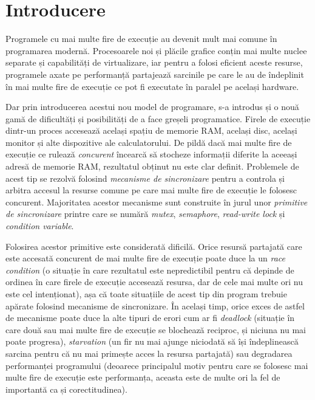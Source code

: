 \section{Introducere}
Programele cu mai multe fire de execuție au devenit mult mai comune
în programarea modernă. Procesoarele noi și plăcile grafice conțin mai
multe nuclee separate și capabilități de virtualizare, iar pentru a
folosi eficient aceste resurse, programele axate pe performanță
partajează sarcinile pe care le au de îndeplinit în mai multe fire de
execuție ce pot fi executate în paralel pe același hardware.

Dar prin introducerea acestui nou model de programare, s-a introdus și o
nouă gamă de dificultăți și posibilități de a face greșeli programatice.
Firele de execuție dintr-un proces accesează același spațiu de memorie
RAM, același disc, același monitor și alte dispozitive ale
calculatorului. De pildă dacă mai multe fire de execuție ce rulează
\textit{concurent} încearcă să stocheze informații diferite la aceeași
adresă de memorie RAM, rezultatul obținut nu este clar definit.
Problemele de acest tip se rezolvă folosind
\textit{mecanisme de sincronizare} pentru a controla și arbitra accesul
la resurse comune pe care mai multe fire de execuție le folosesc
concurent. Majoritatea acestor mecanisme sunt construite în jurul unor
\textit{primitive de sincronizare} printre care se numără
\textit{mutex}, \textit{semaphore}, \textit{read-write lock} și
\textit{condition variable}.

Folosirea acestor primitive este considerată dificilă. Orice resursă
partajată care este accesată concurent de mai multe fire de
execuție poate duce la un \textit{race condition} (o situație în care
rezultatul este nepredictibil pentru că depinde de ordinea în care
firele de execuție accesează resursa, dar de cele mai multe ori nu este
cel intenționat), așa că toate situațiile de acest tip din program
trebuie apărate folosind mecanisme de sincronizare. În același timp,
orice exces de astfel de mecanisme poate duce la alte tipuri de erori
cum ar fi \textit{deadlock} (situație în care două sau mai multe fire de
execuție se blochează reciproc, și niciuna nu mai poate progresa),
\textit{starvation} (un fir nu mai ajunge niciodată să își îndeplinească
sarcina pentru că nu mai primește acces la resursa partajată) sau
degradarea performanței programului (deoarece principalul motiv pentru
care se folosesc mai multe fire de execuție este performanța, aceasta
este de multe ori la fel de importantă ca și corectitudinea).

